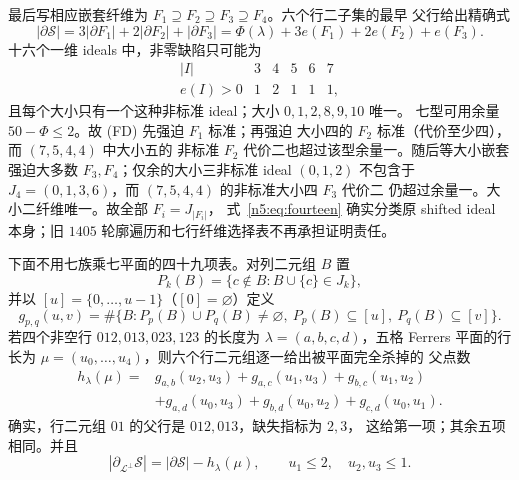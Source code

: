 最后写相应嵌套纤维为
\(F_1\supseteq F_2\supseteq F_3\supseteq F_4\)。六个行二子集的最早
父行给出精确式
\[
 |\partial\mathcal S|
 =3|\partial F_1|+2|\partial F_2|+|\partial F_3|
 =\Phi(\lambda)+3e(F_1)+2e(F_2)+e(F_3).                 \tag{FD}
\]
十六个一维 ideals 中，非零缺陷只可能为
\[
\begin{array}{c|ccccc}
|I|&3&4&5&6&7\\ \hline
e(I)>0&1&2&1&1&1,
\end{array}
\]
且每个大小只有一个这种非标准 ideal；大小 \(0,1,2,8,9,10\) 唯一。
七型可用余量 \(50-\Phi\le2\)。故 (FD) 先强迫 \(F_1\) 标准；再强迫
大小四的 \(F_2\) 标准（代价至少四），而 \((7,5,4,4)\) 中大小五的
非标准 \(F_2\) 代价二也超过该型余量一。随后等大小嵌套强迫大多数
\(F_3,F_4\)；仅余的大小三非标准 ideal \((0,1,2)\) 不包含于
\(J_4=(0,1,3,6)\)，而 \((7,5,4,4)\) 的非标准大小四 \(F_3\) 代价二
仍超过余量一。大小二纤维唯一。故全部 \(F_i=J_{|F_i|}\)，
式~\eqref{n5:eq:fourteen} 确实分类原 shifted ideal 本身；旧
\(1405\) 轮廓遍历和七行纤维选择表不再承担证明责任。

下面不用七族乘七平面的四十九项表。对列二元组 \(B\) 置
\[
 P_k(B)=\{c\notin B:B\cup\{c\}\in J_k\},
\]
并以 \([u]=\{0,\ldots,u-1\}\)（\([0]=\varnothing\)）定义
\[
 g_{p,q}(u,v)=\#\{B:P_p(B)\cup P_q(B)\ne\varnothing,
                  \ P_p(B)\subseteq[u],\ P_q(B)\subseteq[v]\}.
\]
若四个非空行 \(012,013,023,123\) 的长度为
\(\lambda=(a,b,c,d)\)，五格 Ferrers 平面的行长为
\(\mu=(u_0,\ldots,u_4)\)，则六个行二元组逐一给出被平面完全杀掉的
父点数
\begin{equation}\label{n5:eq:six-edge}
\begin{aligned}
h_\lambda(\mu)={}&g_{a,b}(u_2,u_3)+g_{a,c}(u_1,u_3)
                  +g_{b,c}(u_1,u_2)\\
 &+g_{a,d}(u_0,u_3)+g_{b,d}(u_0,u_2)
                  +g_{c,d}(u_0,u_1).
\end{aligned}                                                   \tag{VE}
\end{equation}
确实，行二元组 \(01\) 的父行是 \(012,013\)，缺失指标为 \(2,3\)，
这给第一项；其余五项相同。并且
\[
 |\partial_{\mathcal L^\perp}\mathcal S|
 =|\partial\mathcal S|-h_\lambda(\mu),\qquad
 u_1\le2,\quad u_2,u_3\le1.                                 \tag{VA}
\]


